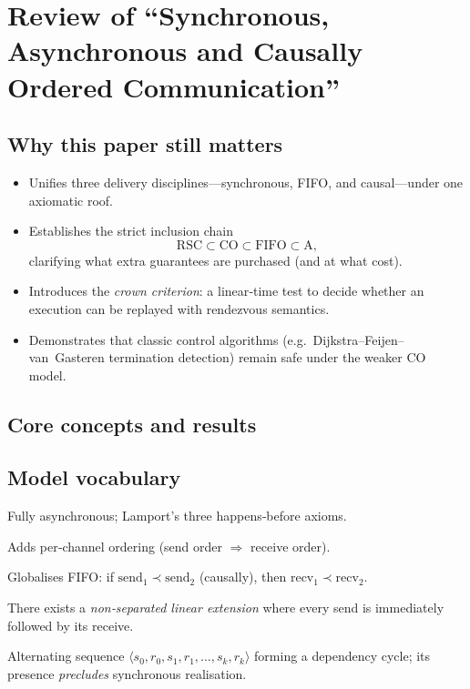 \documentclass[../../../OAE-SPEC-MAIN.tex]{subfiles}
\begin{document}
\section{Review of ``Synchronous, Asynchronous and Causally Ordered Communication''}


\subsection{Why this paper still matters}

\begin{itemize}
  \item Unifies three delivery disciplines—synchronous, FIFO, and causal—under one axiomatic roof.
  \item Establishes the strict inclusion chain
        \[
          \text{RSC} \subset \text{CO} \subset \text{FIFO} \subset \text{A},
        \]
        clarifying what extra guarantees are purchased (and at what cost).
  \item Introduces the \emph{crown criterion}: a linear‑time test to decide whether an execution can be replayed with rendezvous semantics.
  \item Demonstrates that classic control algorithms (e.g.\ Dijkstra–Feijen–van Gasteren termination detection) remain safe under the weaker CO model.
\end{itemize}

\subsection{Core concepts and results}

\subsection{Model vocabulary}
\begin{description}[leftmargin=*,style=nextline]
  \item[A‑computation] Fully asynchronous; Lamport’s three happens‑before axioms.
  \item[FIFO‑computation] Adds per‑channel ordering (send order $\Rightarrow$ receive order).
  \item[CO‑computation] Globalises FIFO: if $\text{send}_1 \prec \text{send}_2$ (causally), then $\text{recv}_1 \prec \text{recv}_2$.
  \item[RSC‑computation] There exists a \emph{non‑separated linear extension} where every send is immediately followed by its receive.
  \item[Crown] Alternating sequence $\langle s_0,r_0,s_1,r_1,\dots,s_k,r_k\rangle$ forming a dependency cycle; its presence \emph{precludes} synchronous realisation.
\end{description}
\end{document}
